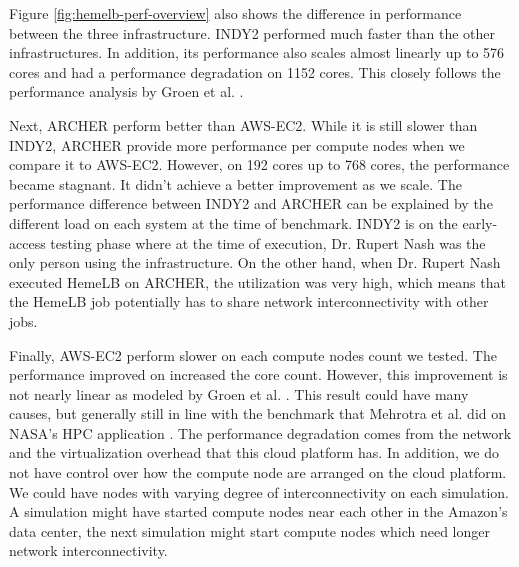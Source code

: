 
Figure \ref{fig:hemelb-perf-overview} also shows the difference in performance between the three infrastructure. INDY2 performed much faster than the other infrastructures. In addition, its performance also scales almost linearly up to 576 cores and had a performance degradation on 1152 cores. This closely follows the performance analysis by Groen et al. \citep{groen2013analysing}. 

Next, ARCHER perform better than AWS-EC2. While it is still slower than INDY2, ARCHER provide more performance per compute nodes when we compare it to AWS-EC2. However, on 192 cores up to 768 cores, the performance became stagnant. It didn't achieve a better improvement as we scale. The performance difference between INDY2 and ARCHER can be explained by the different load on each system at the time of benchmark. INDY2 is on the early-access testing phase where at the time of execution, Dr. Rupert Nash was the only person using the infrastructure. On the other hand, when Dr. Rupert Nash executed HemeLB on ARCHER, the utilization was very high, which means that the HemeLB job potentially has to share network interconnectivity with other jobs.

Finally, AWS-EC2 perform slower on each compute nodes count we tested. The performance improved on increased the core count. However, this improvement is not nearly linear as modeled by Groen et al. \citep{groen2013analysing}. This result could have many causes, but generally still in line with the benchmark that Mehrotra et al. did on NASA's HPC application \citep{mehrotra2012performance}. The performance degradation comes from the network and the virtualization overhead that this cloud platform has. In addition, we do not have control over how the compute node are arranged on the cloud platform. We could have nodes with varying degree of interconnectivity on each simulation. A simulation might have started compute nodes near each other in the Amazon's data center, the next simulation might start compute nodes which need longer network interconnectivity. 

